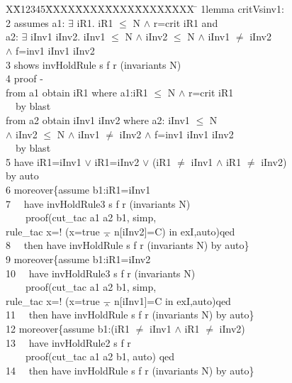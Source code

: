 \documentclass[conference]{IEEEtran}
\newlength{\fminilength}
\newenvironment{fmini}[1][\linewidth]
  {\setlength{\fminilength}{#1\fboxsep-2\fboxrule}%
   \vspace{2ex}\noindent\begin{lrbox}{\fminibox}\begin{minipage}{\fminilength}%
   \mbox{ }\hfill\vspace{-2.5ex}}%
  {\end{minipage}\end{lrbox}\vspace{1ex}\hspace{0ex}%
   \framebox{\usebox{\fminibox}}}
\newenvironment{specification}
{\noindent\scriptsize
\tt\begin{fmini}\begin{tabbing}X\=X12345\=XXXX\=XXXX\=XXXX\=XXXX\=XXXX
\=\+\kill} {\end{tabbing}\normalfont\end{fmini}}
\def \twoSpaces {\ \ }
\def \andc {\barwedge }
\def \negc {!}
\def \iInv {iInv}
\def \iR {iR}
\begin{document}
{\begin{specification}
1lemma critVsinv1:\\
2  assumes  a1: $\exists$ \iR1. \iR1 $\le$ N $\wedge$ r=crit \iR1 and \\
  a2: $\exists$  \iInv1 \iInv2. \iInv1 $\le$ N $\wedge$ \iInv2 $\le$ N $\wedge$ \iInv1 $\neq$ \iInv2 \\
   $\wedge$ f=inv1  \iInv1 \iInv2\\
3  shows  invHoldRule s f r (invariants
  N)\\
4  proof -\\
   from a1 obtain \iR1 where a1:\iR1 $\le$ N $\wedge$ r=crit \iR1 \\
\twoSpaces   by blast\\
   from a2 obtain \iInv1 \iInv2 where a2: \iInv1 $\le$ N \\
   $\wedge$ \iInv2 $\le$ N $\wedge$ \iInv1 $\neq$ \iInv2 $\wedge$ f=inv1  \iInv1 \iInv2\\
\twoSpaces   by blast \\
5  have iR1=\iInv1 $\vee$ \iR1=\iInv2 $\vee$ (\iR1 $\ne$ \iInv1 $\wedge$  \iR1 $\ne$ \iInv2) \\
  by auto\\

6  moreover\{assume  b1:\iR1=\iInv1\\
7  \twoSpaces have invHoldRule3 s f r (invariants N)\\
 \twoSpaces  \twoSpaces   proof(cut\_tac a1 a2 b1, simp, \\
 rule\_tac x=$\negc$ (x=true $\andc$ n[\iInv2]=C)  in exI,auto)qed\\
8  \twoSpaces then have invHoldRule s f r
(invariants
  N)
by auto\}\\

9  moreover\{assume  b1:iR1=\iInv2\\
10 \twoSpaces have invHoldRule3 s f r (invariants N)\\
 \twoSpaces \twoSpaces   proof(cut\_tac a1 a2 b1, simp, \\
 rule\_tac x=$\negc$ (x=true $\andc$ n[\iInv1]=C  in exI,auto)qed\\
11 \twoSpaces then have invHoldRule s f r (invariants
  N)
by auto\}\\

12   moreover\{assume  b1:(\iR1 $\ne$  \iInv1 $\wedge$   \iR1 $\ne$  \iInv2)\\
13 \twoSpaces have invHoldRule2 s f r  \\
  \twoSpaces \twoSpaces  proof(cut\_tac a1 a2 b1,  auto) qed\\
14 \twoSpaces then have invHoldRule s f r
(invariants
  N)
by auto\} \\


\end{specification}}
\end{document}
